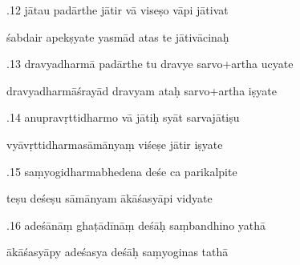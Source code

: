 \documentclass[article,12pt,a4paper]{memoir}%
\newcounter{parCount}
\begin{document}
	  
	  \pstart {}.12 jātau padārthe jātir vā viseṣo vāpi jātivat 
	{}
	\pend%
      

	  
	  \pstart \leavevmode%
	śabdair apekṣyate yasmād atas te jātivācinaḥ 
	{}
	\pend%
      

	  
	  \pstart {}.13 dravyadharmā padārthe tu dravye sarvo+artha ucyate 
	{}
	\pend%
      

	  
	  \pstart \leavevmode%
	dravyadharmāśrayād dravyam ataḥ sarvo+artha iṣyate 
	{}
	\pend%
      

	  
	  \pstart {}.14 anupravṛttidharmo vā jātiḥ syāt sarvajātiṣu 
	{}
	\pend%
      

	  
	  \pstart \leavevmode%
	vyāvṛttidharmasāmānyaṃ viśeṣe jātir iṣyate 
	{}
	\pend%
      

	  
	  \pstart {}.15 saṃyogidharmabhedena deśe ca parikalpite 
	{}
	\pend%
      

	  
	  \pstart \leavevmode%
	teṣu deśeṣu sāmānyam ākāśasyāpi vidyate 
	{}
	\pend%
      

	  
	  \pstart {}.16 adeśānāṃ ghaṭādīnāṃ deśāḥ saṃbandhino yathā 
	{}
	\pend%
      

	  
	  \pstart \leavevmode%
	ākāśasyāpy adeśasya deśāḥ saṃyoginas tathā 
	{}
	\pend%
      
\end{document}
